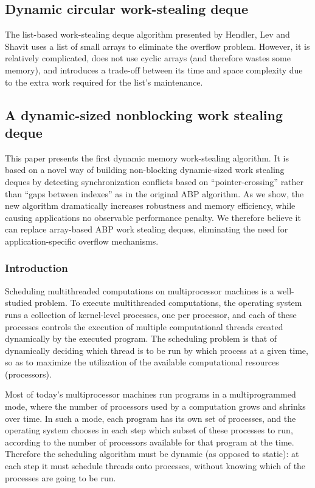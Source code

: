 \subsection{Dynamic circular work-stealing deque \cite{Chase2005}}

The list-based work-stealing deque algorithm presented by Hendler, Lev
and Shavit \cite{Hendler2006, Hendler2006a} uses a list of small
arrays to eliminate the overflow problem. However, it is relatively
complicated, does not use cyclic arrays (and therefore wastes some
memory), and introduces a trade-off between its time and space
complexity due to the extra work required for the list's maintenance.

\subsection{A dynamic-sized nonblocking work stealing deque
  \cite{Hendler2006, Hendler2006a}}

This paper presents the first dynamic memory work-stealing
algorithm. It is based on a novel way of building non-blocking
dynamic-sized work stealing deques by detecting synchronization
conflicts based on ``pointer-crossing'' rather than ``gaps between
indexes'' as in the original ABP algorithm. As we show, the new
algorithm dramatically increases robustness and memory efficiency,
while causing applications no observable performance penalty. We
therefore believe it can replace array-based ABP work stealing deques,
eliminating the need for application-specific overflow mechanisms.

\subsubsection{Introduction}

Scheduling multithreaded computations on multiprocessor machines is a
well-studied problem. To execute multithreaded computations, the
operating system runs a collection of kernel-level processes, one per
processor, and each of these processes controls the execution of
multiple computational threads created dynamically by the executed
program. The scheduling problem is that of dynamically deciding which
thread is to be run by which process at a given time, so as to
maximize the utilization of the available computational resources
(processors).

Most of today's multiprocessor machines run programs in a
multiprogrammed mode, where the number of processors used by a
computation grows and shrinks over time. In such a mode, each program
has its own set of processes, and the operating system chooses in each
step which subset of these processes to run, according to the number
of processors available for that program at the time. Therefore the
scheduling algorithm must be dynamic (as opposed to static): at each
step it must schedule threads onto processes, without knowing which of
the processes are going to be run.

